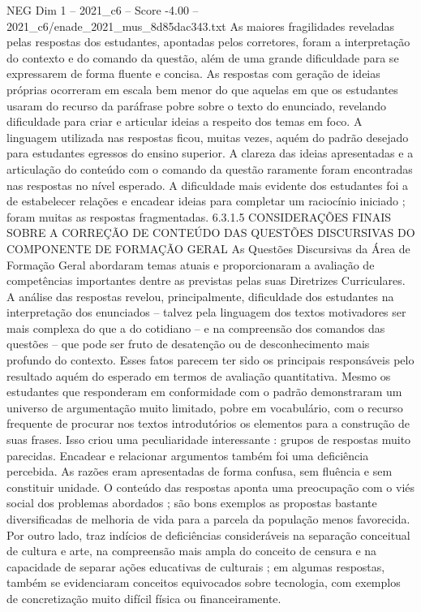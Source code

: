 \begin{textsample}{NEG Dim 1 – 2021\_c6 – Score -4.00 – 2021\_c6/enade\_2021\_mus\_8d85dac343.txt}
As maiores fragilidades reveladas pelas respostas dos estudantes, apontadas pelos corretores, foram a interpretação do contexto e do comando da questão, além de uma grande dificuldade para se expressarem de forma fluente e concisa.
As respostas com geração de ideias próprias ocorreram em escala bem menor do que aquelas em que os estudantes usaram do recurso da paráfrase pobre sobre o texto do enunciado, revelando dificuldade para criar e articular ideias a respeito dos temas em foco.
A linguagem utilizada nas respostas ficou, muitas vezes, aquém do padrão desejado para estudantes egressos do ensino superior.
A clareza das ideias apresentadas e a articulação do conteúdo com o comando da questão raramente foram encontradas nas respostas no nível esperado.
A dificuldade mais evidente dos estudantes foi a de estabelecer relações e encadear ideias para completar um raciocínio iniciado ; foram muitas as respostas fragmentadas. 6.3.1.5 CONSIDERAÇÕES FINAIS SOBRE A CORREÇÃO DE CONTEÚDO DAS QUESTÕES DISCURSIVAS DO COMPONENTE DE FORMAÇÃO GERAL As Questões Discursivas da Área de Formação Geral abordaram temas atuais e proporcionaram a avaliação de competências importantes dentre as previstas pelas suas Diretrizes Curriculares.
A análise das respostas revelou, principalmente, dificuldade dos estudantes na interpretação dos enunciados – talvez pela linguagem dos textos motivadores ser mais complexa do que a do cotidiano – e na compreensão dos comandos das questões – que pode ser fruto de desatenção ou de desconhecimento mais profundo do contexto.
Esses fatos parecem ter sido os principais responsáveis pelo resultado aquém do esperado em termos de avaliação quantitativa.
Mesmo os estudantes que responderam em conformidade com o padrão demonstraram um universo de argumentação muito limitado, pobre em vocabulário, com o recurso frequente de procurar nos textos introdutórios os elementos para a construção de suas frases.
Isso criou uma peculiaridade interessante : grupos de respostas muito parecidas.
Encadear e relacionar argumentos também foi uma deficiência percebida.
As razões eram apresentadas de forma confusa, sem fluência e sem constituir unidade.
O conteúdo das respostas aponta uma preocupação com o viés social dos problemas abordados ; são bons exemplos as propostas bastante diversificadas de melhoria de vida para a parcela da população menos favorecida.
Por outro lado, traz indícios de deficiências consideráveis na separação conceitual de cultura e arte, na compreensão mais ampla do conceito de censura e na capacidade de separar ações educativas de culturais ; em algumas respostas, também se evidenciaram conceitos equivocados sobre tecnologia, com exemplos de concretização muito difícil física ou financeiramente.

\end{textsample}
